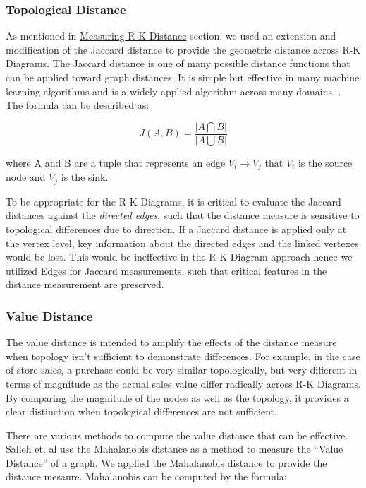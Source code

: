 \subsubsection{Topological Distance}
\label{subsec:topological_distance}

As mentioned in \hyperref[sec:rk_distance]{Measuring R-K Distance} section, we used an extension and modification of the Jaccard distance to provide the geometric distance across R-K Diagrams. The Jaccard distance is one of many possible distance functions that can be applied toward graph distances. It is simple but effective in many machine learning algorithms and is a widely applied algorithm across many domains. \cite{roughgarden_valiant_2021}. The formula can be described as:

\begin{equation}
J(A,B) = \frac{| A \bigcap B |}{| A \bigcup B |}
\end{equation}

where A and B are a tuple that represents an edge $V_{i} \to V_{j}$ that $V_{i}$ is the source node and $V_{j}$ is the sink.

To be appropriate for the R-K Diagrams, it is critical to evaluate the Jaccard distances against the \textit{directed edges}, such that the distance measure is sensitive to topological differences due to direction. If a Jaccard distance is applied only at the vertex level, key information about the directed edges and the linked vertexes would be lost. This would be ineffective in the R-K Diagram approach hence we utilized Edges for Jaccard measurements, such that critical features in the distance measurement are preserved.

\subsubsection{Value Distance}
\label{subsec:valuedistance}

The value distance is intended to amplify the effects of the distance measure when topology isn't sufficient to demonstrate differences. For example, in the case of store sales, a purchase could be very similar topologically, but very different in terms of magnitude as the actual sales value differ radically across R-K Diagrams. By comparing the magnitude of the nodes as well as the topology, it provides a clear distinction when topological differences are not sufficient.

There are various methods to compute the value distance that can be effective. Salleh et. al use the Mahalanobis distance as a method to measure the ``Value Distance'' of a graph.  We applied the Mahalanobis distance to provide the distance mesaure. Mahalanobis can be computed by the formula: \cite{Salleh1_et_al}

